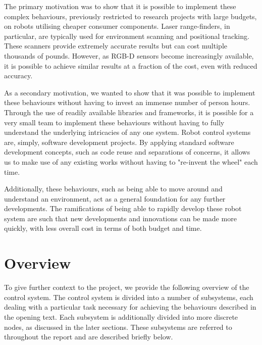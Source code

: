 The primary motivation was to show that it is possible to implement these complex behaviours, previously restricted to research projects with large budgets, on robots utilising cheaper consumer components. Laser range-finders, in particular, are typically used for environment scanning and positional tracking. These scanners provide extremely accurate results but can cost multiple thousands of pounds. However, as RGB-D sensors become increasingly available, it is possible to achieve similar results at a fraction of the cost, even with reduced accuracy.

As a secondary motivation, we wanted to show that it was possible to implement these behaviours without having to invest an immense number of person hours. Through the use of readily available libraries and frameworks, it is possible for a very small team to implement these behaviours without having to fully understand the underlying intricacies of any one system. Robot control systems are, simply, software development projects. By applying standard software development concepts, such as code reuse and separations of concerns, it allows us to make use of any existing works without having to "re-invent the wheel" each time.

Additionally, these behaviours, such as being able to move around and understand an environment, act as a general foundation for any further developments. The ramifications of being able to rapidly develop these robot system are such that new developments and innovations can be made more quickly, with less overall cost in terms of both budget and time.

\section{Overview}

To give further context to the project, we provide the following overview of the control system. The control system is divided into a number of subsystems, each dealing with a particular task necessary for achieving the behaviours described in the opening text. Each subsystem is additionally divided into more discrete nodes, as discussed in the later sections. These subsystems are referred to throughout the report and are described briefly below.

